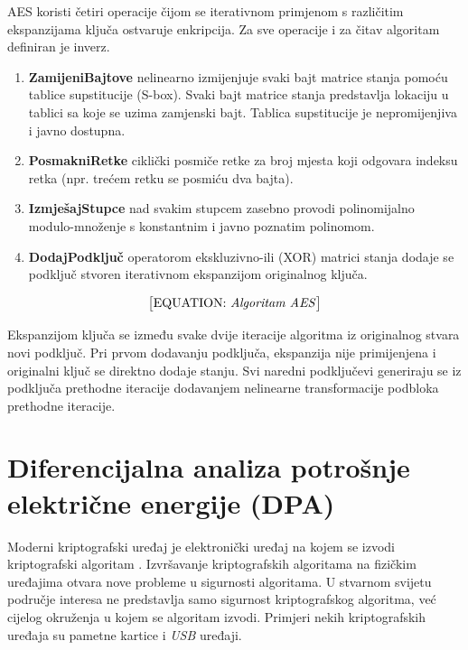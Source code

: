 \documentclass[times, utf8, numeric, diplomski]{fer}
\def\todoeq#1{\textcolor{red}{\begin{equation}\text{\big[EQUATION: \textit{#1}\big]}\end{equation}}}
\begin{document}
AES koristi četiri operacije čijom se iterativnom primjenom s različitim ekspanzijama ključa ostvaruje enkripcija. Za sve operacije i za čitav algoritam definiran je inverz.
\begin{enumerate}
\item
\textbf{ZamijeniBajtove} nelinearno izmijenjuje svaki bajt matrice stanja pomoću tablice supstitucije (S-box). Svaki bajt matrice stanja predstavlja lokaciju u tablici sa koje se uzima zamjenski bajt. Tablica supstitucije je nepromijenjiva i javno dostupna.

\item
\textbf{PosmakniRetke} ciklički posmiče retke za broj mjesta koji odgovara indeksu retka (npr. trećem retku se posmiću dva bajta).

\item
\textbf{IzmješajStupce} nad svakim stupcem zasebno provodi polinomijalno modulo-množenje s konstantnim i javno poznatim polinomom. 

\item
\textbf{DodajPodključ} operatorom ekskluzivno-ili (XOR) matrici stanja dodaje se podključ stvoren iterativnom ekspanzijom originalnog ključa.
\end{enumerate}

\todoeq{Algoritam AES}

Ekspanzijom ključa se između svake dvije iteracije algoritma iz originalnog stvara novi podključ. Pri prvom dodavanju podključa, ekspanzija nije primijenjena i originalni ključ se direktno dodaje stanju. Svi naredni podključevi generiraju se iz podključa prethodne iteracije dodavanjem nelinearne transformacije podbloka prethodne iteracije.



\section{Diferencijalna analiza potrošnje električne energije (DPA)}

Moderni kriptografski uređaj je elektronički uređaj na kojem se izvodi kriptografski algoritam \citep{mangard2008power}. Izvršavanje kriptografskih algoritama na fizičkim uređajima otvara nove probleme u sigurnosti algoritama. U stvarnom svijetu područje interesa ne predstavlja samo sigurnost kriptografskog algoritma, već cijelog okruženja u kojem se algoritam izvodi. Primjeri nekih kriptografskih uređaja su pametne kartice i \textit{USB} uređaji.
\end{document}
